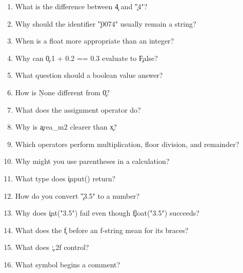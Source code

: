 
\begin{enumerate}
    \item What is the difference between \c{4} and \c{"4"}?
    \item Why should the identifier \c{"0074"} usually remain a string?
    \item When is a float more appropriate than an integer?
    \item Why can \c{0.1 + 0.2 == 0.3} evaluate to \c{False}?
    \item What question should a boolean value answer?
    \item How is \c{None} different from \c{0}?
    \item What does the assignment operator do?
    \item Why is \c{area_m2} clearer than \c{x}?
    \item Which operators perform multiplication, floor division, and remainder?
    \item Why might you use parentheses in a calculation?
    \item What type does \c{input()} return?
    \item How do you convert \c{"3.5"} to a number?
    \item Why does \c{int("3.5")} fail even though \c{float("3.5")} succeeds?
    \item What does the \c{f} before an f-string mean for its braces?
    \item What does \c{:.2f} control?
    \item What symbol begins a comment?
\end{enumerate}


